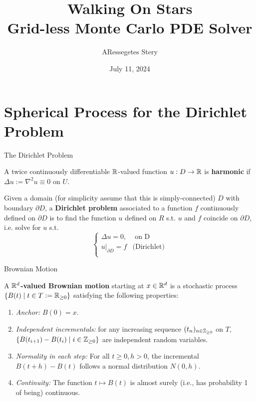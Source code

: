 \documentclass{beamer}
\title{Walking On Stars \\[1pt] {\Large Grid-less Monte Carlo PDE Solver}}
\author{ARessegetes Stery}
\date{July 11, 2024}
\begin{document}
\maketitle


\section{Spherical Process for the Dirichlet Problem}

\begin{frame}{The Dirichlet Problem}

	\begin{definition}\label{def: harmonic function}
		A twice continuously differentiable $\mathbb{R}$-valued function $u: D \to \mathbb{R}$ is \textbf{harmonic} if $\Delta u := \nabla^2 u \equiv 0$ on $U$.
	\end{definition}
	\horzline

	\begin{definition}
		Given a domain (for simplicity assume that this is simply-connected) $D$ with boundary $\partial D$, a \textbf{Dirichlet problem} associated to a function $f$ continuously defined on $\partial D$ is to find the function $u$ defined on $R$ s.t. $u$ and $f$ coincide on $\partial D$, i.e. solve for $u$ s.t.
		\[
			\begin{cases}
				\Delta u = 0, & \text{ on D} \\
				\left. u \right|_{\partial D} = f & \text{(Dirichlet)} \\
			\end{cases}
		\]
	\end{definition}
	\horzline

\end{frame}

\begin{frame}{Brownian Motion}

	\begin{definition}
		A \textbf{$\mathbb{R}^d$-valued Brownian motion} starting at $x \in \mathbb{R}^d$ is a stochastic process $\{ B(t) \mid t \in T := \mathbb{R}_{\geq 0} \}$ satisfying the following properties:
		\begin{enumerate}
			\item \emph{Anchor:} $B(0) = x$.
			\item \emph{Independent incrementals:} for any increasing sequence $(t_n)_{n \in \mathbb{Z}_{\geq 0}}$ on $T$, $\{ B(t_{i+1}) - B(t_i) \mid i \in \mathbb{Z}_{\geq 0} \}$ are independent random variables.
			\item \emph{Normality in each step:} For all $t \geq 0, h > 0$, the incremental $B(t + h) - B(t)$ follows a normal distribution $N(0, h)$.
			\item \emph{Continuity:} The function $t \mapsto B(t)$ is almost surely (i.e., has probability 1 of being) continuous.
		\end{enumerate}
	\end{definition}
	\horzline

\end{frame}
\end{document}
